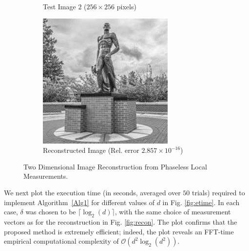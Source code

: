 \begin{figure}[p]
\begin{subfigure}[b]{0.495\textwidth}
        \caption{Test Image $2$ ($256\times 256$ pixels)}
        \label{fig:true_msu}
    \end{subfigure}
    \hfill
    \begin{subfigure}[b]{0.495\textwidth}
        \centering
        \includegraphics[scale=0.75]{recon}
        \caption{Reconstructed Image (Rel. error $2.857\times 10^{-16}$)}
        \label{fig:recon_msu}
    \end{subfigure}
    \vspace{0.05in}
    \caption{Two Dimensional Image Reconstruction from Phaseless Local Measurements.}
    \label{fig:2d-recon}
\end{figure}
%


We next plot the execution time (in seconds, averaged over $50$ trials) required to implement
Algorithm~\ref{Alg1} for different values of $d$ in Fig. \ref{fig:etime}. In each case, $\delta$ was
chosen to be $\lceil \log_2(d) \rceil$, with the same choice of measurement vectors as for the
reconstruction in Fig.  \ref{fig:recon}. The plot confirms that the proposed method is extremely
efficient; indeed, the plot reveals an FFT-time empirical computational complexity of $\mathcal
O(d^2 \log_2(d^2))$.

